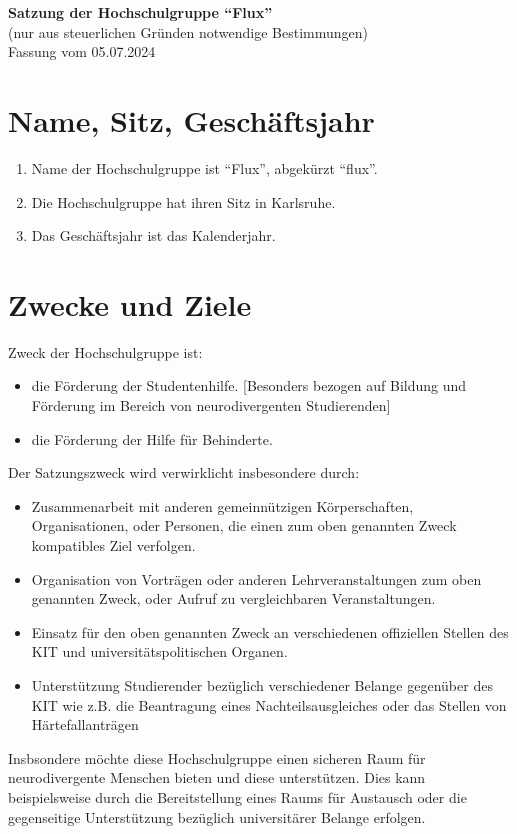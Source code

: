 \documentclass[11pt]{article}
\begin{document}
	\begin{center}
		\Large
		\textbf{
			Satzung der Hochschulgruppe ``Flux''}\\
		\normalsize
		(nur aus steuerlichen Gründen notwendige Bestimmungen)\\
		\vspace{10mm}
		Fassung vom 05.07.2024
		\vspace{10mm}
	\end{center}

	\section{Name, Sitz, Geschäftsjahr}
	\begin{enumerate}
		\item Name der Hochschulgruppe ist ``Flux'', abgekürzt ``flux''.
		\item Die Hochschulgruppe hat ihren Sitz in Karlsruhe.
		\item Das Geschäftsjahr ist das Kalenderjahr.
	\end{enumerate}
	\section{Zwecke und Ziele}
    \label{zweck}
	Zweck der Hochschulgruppe ist:
	\begin{itemize}
		\item die Förderung der Studentenhilfe. [Besonders bezogen auf Bildung und Förderung im Bereich von neurodivergenten Studierenden]
		\item die Förderung der Hilfe für Behinderte.
	\end{itemize}
	Der Satzungszweck wird verwirklicht insbesondere durch: 
	\begin{itemize}
		\item Zusammenarbeit mit anderen gemeinnützigen Körperschaften, Organisationen, oder Personen, die einen zum oben genannten Zweck kompatibles Ziel verfolgen.
		\item Organisation von Vorträgen oder anderen Lehrveranstaltungen zum oben genannten Zweck, oder Aufruf zu vergleichbaren Veranstaltungen.
		\item Einsatz für den oben genannten Zweck an verschiedenen offiziellen Stellen des KIT und universitätspolitischen Organen.
        \item Unterstützung Studierender bezüglich verschiedener Belange gegenüber des KIT wie z.B. die Beantragung eines Nachteilsausgleiches oder das Stellen von Härtefallanträgen
	\end{itemize}
    Insbsondere möchte diese Hochschulgruppe einen sicheren Raum für neurodivergente Menschen bieten und diese unterstützen. Dies kann beispielsweise durch die Bereitstellung eines Raums für Austausch oder die gegenseitige Unterstützung bezüglich universitärer Belange erfolgen.
 
\end{document}
